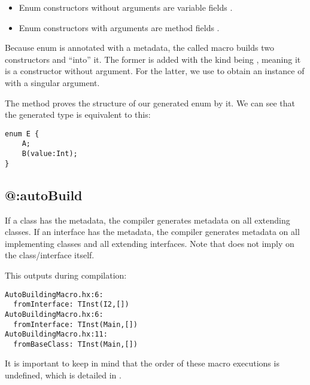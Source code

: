 \begin{itemize}
	\item Enum constructors without arguments are variable fields .
	\item Enum constructors with arguments are method fields .
\end{itemize}



Because enum  is annotated with a  metadata, the called macro builds two constructors  and  ``into'' it. The former is added with the kind being , meaning it is a constructor without argument. For the latter, we use  to obtain an instance of  with a singular  argument.

The  method proves the structure of our generated enum by  it. We can see that the generated type is equivalent to this:

\begin{lstlisting}
enum E {
	A;
	B(value:Int);
}
\end{lstlisting}


\subsection{@:autoBuild}
\label{macro-auto-build}

If a class has the  metadata, the compiler generates  metadata on all extending classes. If an interface has the  metadata, the compiler generates  metadata on all implementing classes and all extending interfaces. Note that  does not imply  on the class/interface itself.


This outputs during compilation:

\begin{lstlisting}
AutoBuildingMacro.hx:6:
  fromInterface: TInst(I2,[])
AutoBuildingMacro.hx:6:
  fromInterface: TInst(Main,[])
AutoBuildingMacro.hx:11:
  fromBaseClass: TInst(Main,[])
\end{lstlisting}

It is important to keep in mind that the order of these macro executions is undefined, which is detailed in .



